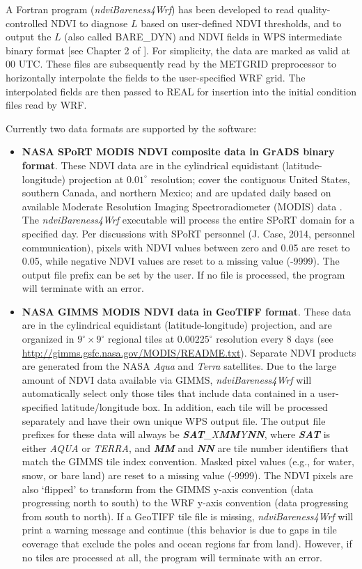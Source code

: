 \documentclass{article}
\begin{document}
A Fortran program (\textit{ndviBareness4Wrf}) has been developed to read 
quality-controlled NDVI to diagnose $L$ based on user-defined NDVI thresholds,
and to output the $L$ (also called BARE\_DYN) and NDVI fields in WPS 
intermediate binary format [see Chapter 2 of \cite{ref:ArwUserGuide}].  
For simplicity, the data are marked as valid at 00 UTC.  These files are 
subsequently read by the METGRID preprocessor to horizontally interpolate the 
fields to the user-specified WRF grid.  The interpolated fields are then 
passed to REAL for insertion into the initial condition files read by WRF.  

Currently two data formats are supported by the software:

\begin{itemize}
\item \textbf{NASA SPoRT MODIS NDVI composite data in GrADS binary format}.  
These NDVI data are in the cylindrical equidistant (latitude-longitude) 
projection at $0.01^{\circ}$ resolution; cover the contiguous United States, 
southern Canada, and northern Mexico; and are updated daily based on 
available Moderate Resolution Imaging Spectroradiometer (MODIS) data
\citep{ref:CaseEtAl2011}.  The \textit{ndviBareness4Wrf} executable will 
process the entire SPoRT domain for a specified day.  Per discussions with 
SPoRT personnel (J. Case, 2014, personnel communication), pixels with NDVI 
values between zero and 0.05 are reset to 0.05, while negative NDVI values
are reset to a missing value (-9999). The output file prefix can be set by 
the user.  If no file is processed, the program will terminate with an error.

\item \textbf{NASA GIMMS MODIS NDVI data in GeoTIFF format}.  These data are 
in the cylindrical equidistant (latitude-longitude) projection, and are
organized in $9^{\circ} \times 9^{\circ}$ regional tiles at $0.00225^{\circ}$ 
resolution every 8 days (see 
\url{http://gimms.gsfc.nasa.gov/MODIS/README.txt}).  Separate NDVI products 
are generated from the NASA \textit{Aqua} and \textit{Terra} satellites. Due 
to the large amount of NDVI data available via GIMMS, 
\textit{ndviBareness4Wrf} will automatically select only those tiles that 
include data contained in a user-specified latitude/longitude box.  In 
addition, each tile will be processed separately and have their own unique WPS
output file.  The output file prefixes for these data will always be 
\textit{\textbf{SAT}\_X\textbf{MM}Y\textbf{NN}}, where 
\textit{\textbf{SAT}} is either \textit{AQUA} or \textit{TERRA}, and 
\textit{\textbf{MM}} and \textit{\textbf{NN}} are tile number identifiers that
match the GIMMS tile index convention.  Masked pixel values (e.g., for water, 
snow, or bare land) are reset to a missing value (-9999). The NDVI pixels are 
also `flipped' to transform from the GIMMS y-axis convention (data progressing
north to south) to the WRF y-axis convention (data progressing from south to 
north). If a GeoTIFF tile file is missing, \textit{ndviBareness4Wrf} will 
print a warning message and continue (this behavior is due to gaps in tile 
coverage that exclude the poles and ocean regions far from land).  However, if
no tiles are processed at all, the program will terminate with an error.


\end{itemize}
\end{document}
